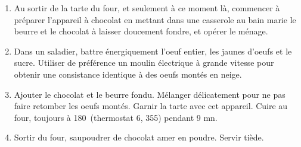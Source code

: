 \begin{recipe}
  \begin{enumerate}

  \item Au sortir de la tarte du four, et seulement \`a ce moment l\`a, commencer \`a
    pr\'eparer l'appareil \`a chocolat en mettant dans une casserole au bain
    marie le beurre et le chocolat \`a laisser doucement fondre, et op\'erer le
    m\'enage.


  \item Dans un saladier, battre \'energiquement l'oeuf entier, les jaunes
    d'oeufs et le sucre. Utiliser de pr\'ef\'erence un moulin \'electrique \`a
    grande vitesse pour obtenir une consistance identique \`a des oeufs
    mont\'es en neige.

  \item 
    Ajouter le chocolat et le beurre fondu. M\'elanger d\'elicatement pour ne
    pas faire retomber les oeufs mont\'es. Garnir la tarte avec cet appareil.
    Cuire au four, toujours \`a 180\C\ (thermostat 6, 355\F)  pendant 9 mn.

  \item 
    Sortir du four, saupoudrer de chocolat amer en poudre. Servir ti\`ede.

  \end{enumerate}
\end{recipe}
